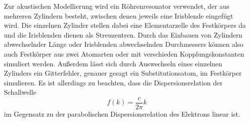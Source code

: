 Zur akustischen Modellierung wird ein Röhrenresonator verwendet, der aus mehreren Zylindern besteht, zwischen denen jeweils eine Irisblende eingefügt wird. Die einzelnen Zylinder stellen dabei eine Elementarzelle des Festkörpers da und die Irisblenden dienen als Streuzentren. Durch das Einbauen von Zylindern abwechselnder Länge oder Irisblenden abwechselnden Durchmessers können also auch Festkörper aus zwei Atomarten oder mit verschieden Kopplungskonstanten simuliert werden. Außerdem lässt sich durch Auswechseln eines einzelnen Zylinders ein Gitterfehler, genauer gesagt ein Substitutionsatom, im Festkörper simulieren. Es ist allerdings zu beachten, dass die Dispersionsrelation der Schallwelle
\begin{equation}
  f (k) = \frac{c}{2\pi} k
  \label{eq:dispersion_schall}
\end{equation}
im Gegensatz zu der parabolischen Dispersionsrelation des Elektrons linear ist.
